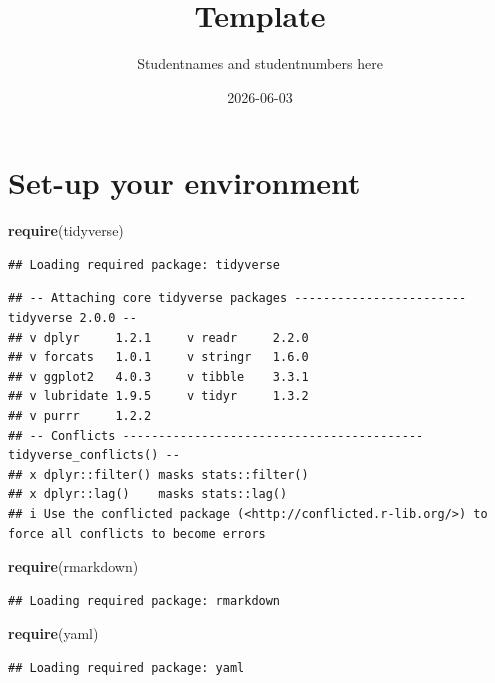 \documentclass[
]{article}
\title{Template}
\author{Studentnames and studentnumbers here}
\date{2026-06-03}
\newenvironment{Shaded}{\begin{snugshade}}{\end{snugshade}}
\newcommand{\FunctionTok}[1]{\textcolor[rgb]{0.13,0.29,0.53}{\textbf{#1}}}
\newcommand{\NormalTok}[1]{#1}
\begin{document}
\maketitle

\section{Set-up your environment}\label{set-up-your-environment}

\begin{Shaded}
\begin{Highlighting}[]
\FunctionTok{require}\NormalTok{(tidyverse)}
\end{Highlighting}
\end{Shaded}

\begin{verbatim}
## Loading required package: tidyverse
\end{verbatim}

\begin{verbatim}
## -- Attaching core tidyverse packages ------------------------ tidyverse 2.0.0 --
## v dplyr     1.2.1     v readr     2.2.0
## v forcats   1.0.1     v stringr   1.6.0
## v ggplot2   4.0.3     v tibble    3.3.1
## v lubridate 1.9.5     v tidyr     1.3.2
## v purrr     1.2.2     
## -- Conflicts ------------------------------------------ tidyverse_conflicts() --
## x dplyr::filter() masks stats::filter()
## x dplyr::lag()    masks stats::lag()
## i Use the conflicted package (<http://conflicted.r-lib.org/>) to force all conflicts to become errors
\end{verbatim}

\begin{Shaded}
\begin{Highlighting}[]
\FunctionTok{require}\NormalTok{(rmarkdown)}
\end{Highlighting}
\end{Shaded}

\begin{verbatim}
## Loading required package: rmarkdown
\end{verbatim}

\begin{Shaded}
\begin{Highlighting}[]
\FunctionTok{require}\NormalTok{(yaml)}
\end{Highlighting}
\end{Shaded}

\begin{verbatim}
## Loading required package: yaml
\end{verbatim}
\end{document}
